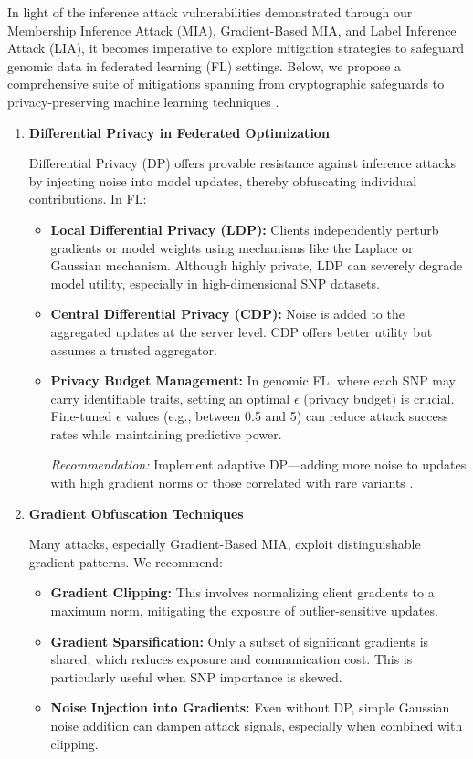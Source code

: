 \documentclass[conference]{IEEEtran}
\begin{document}
In light of the inference attack vulnerabilities demonstrated through our Membership Inference Attack (MIA), Gradient-Based MIA, and Label Inference Attack (LIA), it becomes imperative to explore mitigation strategies to safeguard genomic data in federated learning (FL) settings. Below, we propose a comprehensive suite of mitigations spanning from cryptographic safeguards to privacy-preserving machine learning techniques \cite{chen2021differential45}\cite{shukla2024federated44}.
\begin{enumerate}
    \item \textbf{Differential Privacy in Federated Optimization}
    
    Differential Privacy (DP) offers provable resistance against inference attacks by injecting noise into model updates, thereby obfuscating individual contributions. In FL:
    \begin{itemize}
        \item \textbf{Local Differential Privacy (LDP):} Clients independently perturb gradients or model weights using mechanisms like the Laplace or Gaussian mechanism. Although highly private, LDP can severely degrade model utility, especially in high-dimensional SNP datasets\cite{chen2021differential45}\cite{shukla2024federated44}.
        \item \textbf{Central Differential Privacy (CDP):} Noise is added to the aggregated updates at the server level. CDP offers better utility but assumes a trusted aggregator\cite{chen2021differential45}.
        \item \textbf{Privacy Budget Management:} In genomic FL, where each SNP may carry identifiable traits, setting an optimal $\epsilon$ (privacy budget) is crucial. Fine-tuned $\epsilon$ values (e.g., between 0.5 and 5) can reduce attack success rates while maintaining predictive power\cite{chen2021differential45}.    
    
        \textit{Recommendation:} Implement adaptive DP—adding more noise to updates with high gradient norms or those correlated with rare variants \cite{chen2021differential45}.
    \end{itemize}
    \item \textbf{Gradient Obfuscation Techniques}
    
    Many attacks, especially Gradient-Based MIA, exploit distinguishable gradient patterns. We recommend:
    \begin{itemize}
        \item \textbf{Gradient Clipping:} This involves normalizing client gradients to a maximum norm, mitigating the exposure of outlier-sensitive updates\cite{yue2022gradient47}.
        \item \textbf{Gradient Sparsification:} Only a subset of significant gradients is shared, which reduces exposure and communication cost. This is particularly useful when SNP importance is skewed\cite{yue2022gradient47}.
        \item \textbf{Noise Injection into Gradients:} Even without DP, simple Gaussian noise addition can dampen attack signals, especially when combined with clipping\cite{yue2022gradient47}.
        

\end{itemize}
\end{enumerate}
\end{document}
